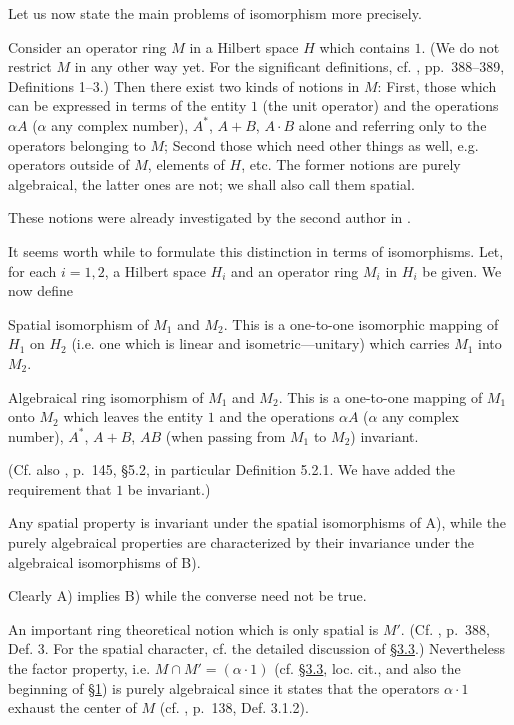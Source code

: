 \documentclass[b5paper,twoside]{article}
\newcommand{\secref}[2]{\hyperref[#1]{\mbox{\S#2}}}
\theoremstyle{mvnplain}
\newcommand{\M}{\mathbf M}
\newcommand{\Hilbert}{\mathfrak H}
\def\M{M}%
\def\Hilbert{H}%
\def\mathfrak#1{#1}%
\begin{document}
Let us now state the main problems of isomorphism more precisely.

Consider an operator ring $\M$ in a Hilbert space $\Hilbert$ which contains
$1$. (We do not restrict $\M$ in any other way yet. For the significant
definitions, cf. \cite{ref2}, pp.~388--389, Definitions 1--3.) Then there exist
two kinds of notions in $\M$: First, those which can be expressed in terms of
the entity $1$ (the unit operator) and the operations $\alpha A$ ($\alpha$ any
complex number), $A^*$, $A+B$, $A\cdot B$ alone and referring only to the
operators belonging to $\M$; Second those which need other things as well,
e.g. operators outside of $\M$, elements of $\Hilbert$, etc. The former
notions are purely algebraical, the latter ones are not; we shall also call
them spatial.

These notions were already investigated by the second author in \cite{ref9}.

It seems worth while to formulate this distinction in terms of isomorphisms.
Let, for each $i=1,2$, a Hilbert space $\Hilbert_i$ and an operator ring
$\M_i$ in $\Hilbert_i$ be given. We now define

\begin{description}[style=nextline,leftmargin=1.5em]
\item[A)] Spatial isomorphism of $\M_1$ and $\M_2$. This is a one-to-one
isomorphic mapping of $\Hilbert_1$ on $\Hilbert_2$ (i.e. one which is linear
and isometric---unitary) which carries $\M_1$ into $\M_2$.
\item[B)] Algebraical ring isomorphism of $\M_1$ and $\M_2$. This is a
one-to-one mapping of $\M_1$ onto $\M_2$ which leaves the entity $1$ and the
operations $\alpha A$ ($\alpha$ any complex number), $A^*$, $A+B$, $AB$
(when passing from $\M_1$ to $\M_2$) invariant.
\end{description}

(Cf. also \cite{ref5}, p.~145, \S5.2, in particular Definition 5.2.1. We have
added the requirement that $1$ be invariant.)

Any spatial property is invariant under the spatial isomorphisms of A), while
the purely algebraical properties are characterized by their invariance under
the algebraical isomorphisms of B).

Clearly A) implies B) while the converse need not be true.

An important ring theoretical notion which is only spatial is $\M'$. (Cf.
\cite{ref2}, p.~388, Def. 3. For the spatial character, cf. the detailed
discussion of \secref{sec:3.3}{3.3}.) Nevertheless the factor property, i.e.
$\M\cap\M'=(\alpha\cdot1)$ (cf. \secref{sec:3.3}{3.3}, loc. cit., and also
the beginning of \hyperref[intro:1]{\S1}) is purely algebraical since it
states that the operators $\alpha\cdot1$ exhaust the center of $\M$ (cf.
\cite{ref5}, p.~138, Def. 3.1.2).
\end{document}
